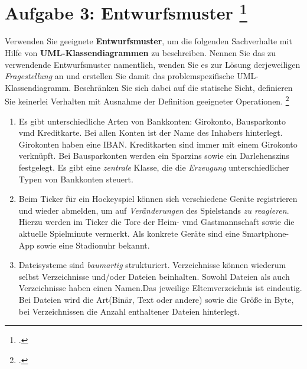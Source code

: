 \documentclass{lehramt-informatik-aufgabe}
\begin{document}

\section{Aufgabe 3: Entwurfsmuster
\footcite{sosy:pu:4}}

Verwenden Sie geeignete \textbf{Entwurfsmuster}, um die folgenden
Sachverhalte mit Hilfe von \textbf{UML-Klassendiagrammen} zu
beschreiben. Nennen Sie das zu verwendende Entwurfsmuster namentlich,
wenden Sie es zur Lösung derjeweiligen \emph{Fragestellung} an und
erstellen Sie damit das problemspezifische UML-Klassendiagramm.
Beschränken Sie sich dabei auf die statische Sicht, \dh definieren Sie
keinerlei Verhalten mit Ausnahme der Definition geeigneter Operationen.
\footcite[Seite 11]{examen:46116:2017:09}

\begin{enumerate}
\item Es gibt unterschiedliche Arten von Bankkonten: Girokonto,
Bausparkonto vmd Kreditkarte. Bei allen Konten ist der Name des Inhabers
hinterlegt. Girokonten haben eine IBAN. Kreditkarten sind immer mit
einem Girokonto verknüpft. Bei Bausparkonten werden ein Sparzins sowie
ein Darlehenszins festgelegt. Es gibt eine \emph{zentrale} Klasse, die
die \emph{Erzeugung} unterschiedlicher Typen von Bankkonten steuert.

\item Beim Ticker für ein Hockeyspiel können sich verschiedene Geräte
registrieren und wieder abmelden, um auf \emph{Veränderungen} des
Spielstands \emph{zu reagieren}. Hierzu werden im Ticker die Tore der
Heim- vmd Gastmannschaft sowie die aktuelle Spielminute vermerkt. Als
konkrete Geräte sind eine Smartphone-App sowie eine Stadionuhr bekannt.

\item Dateisysteme sind \emph{baumartig} strukturiert. Verzeichnisse
können wiederum selbst Verzeichnisse und/oder Dateien beinhalten. Sowohl
Dateien als auch Verzeichnisse haben einen Namen.Das jeweilige
Eltemverzeichnis ist eindeutig. Bei Dateien wird die Art(Binär, Text
oder andere) sowie die Größe in Byte, bei Verzeichnissen die Anzahl
enthaltener Dateien hinterlegt.

\end{enumerate}
\end{document}
